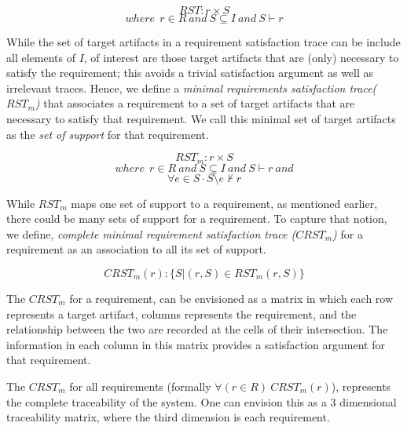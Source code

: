 $$ RST: r \times S$$
$$where~~r \in R~and~S \subseteq I~and~ S \vdash r $$


While the set of target artifacts in a requirement satisfaction trace can be include all elements of $I$, of interest are those target artifacts that are (only) necessary to satisfy the requirement; this avoids a trivial satisfaction argument as well as irrelevant traces. Hence, we define a \emph{minimal requirements satisfaction trace($RST_m$)} that associates a requirement to a set of target artifacts that are necessary to satisfy that requirement. We call this minimal set of target artifacts as the \emph{set of support} for that requirement.

$$ RST_m: r \times S $$
$$ where~~r \in R~and~S \subseteq I~and~ S \vdash r~and $$
$$ \forall e \in S \cdot S \setminus e \nvdash r $$

While $RST_m$ maps one set of support to a requirement, as mentioned earlier, there could be many sets of support for a requirement. To capture that notion, we define, \emph{complete minimal requirement satisfaction trace ($CRST_m$)} for a requirement as an association to all its set of support.

$$ CRST_m (r) : \{ S | (r,S) \in RST_m(r,S) \} $$

The $CRST_m$ for a requirement, can be envisioned as a matrix in which each row represents a target artifact, columns represents the requirement, and the relationship between the two are recorded at the cells of their intersection. The information in each column in this matrix provides a satisfaction argument for that requirement.

The $CRST_m$ for all requirements (formally $\forall (r \in R)~CRST_m(r)$), represents the complete traceability of the system. One can envision this as a 3 dimensional traceability matrix, where the third dimension is each requirement.




